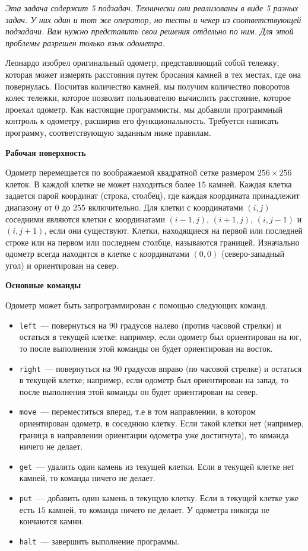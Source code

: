 \it{Эта задача содержит 5 подзадач. Технически они реализованы в виде 5 разных задач. У них один и тот же оператор, но тесты и чекер из соответствующей подзадачи. Вам нужно представить свои решения отдельно по ним. Для этой проблемы разрешен только язык одометра.}

Леонардо изобрел оригинальный одометр, представляющий собой тележку, которая может
измерять расстояния путем бросания камней в тех местах, где она повернулась. Посчитав
количество камней, мы получим количество поворотов колес тележки, которое позволит
пользователю вычислить расстояние, которое проехал одометр. Как настоящие
программисты, мы добавили программный контроль к одометру, расширив его
функциональность. Требуется написать программу, соответствующую заданным ниже
правилам.

\textbf{Рабочая поверхность}

Одометр перемещается по воображаемой квадратной сетке размером $256 \times 256$ клеток. В
каждой клетке не может находиться более $15$ камней. Каждая клетка задается парой
координат (строка, столбец), где каждая координата принадлежит диапазону от $0$ до $255$
включительно. Для клетки с координатами $(i, j)$ соседними являются клетки с
координатами $(i - 1, j)$, $(i + 1, j)$, $(i, j - 1)$ и $(i, j + 1)$, если они существуют. Клетки,
находящиеся на первой или последней строке или на первом или последнем столбце,
называются границей. Изначально одометр всегда находится в клетке с координатами $(0,
0)$ (северо-западный угол) и ориентирован на север.

\textbf{Основные команды}

Одометр может быть запрограммирован с помощью следующих команд.

\begin{itemize}
\item \texttt{left}~--- повернуться на $90$ градусов налево (против часовой стрелки) и остаться в
текущей клетке; например, если одометр был ориентирован на юг, то после
выполнения этой команды он будет ориентирован на восток.
\item \texttt{right}~--- повернуться на $90$ градусов вправо (по часовой стрелке) и остаться в
текущей клетке; например, если одометр был ориентирован на запад, то после
выполнения этой команды он будет ориентирован на север.
\item \texttt{move}~--- переместиться вперед, т.е в том направлении, в котором ориентирован
одометр, в соседнюю клетку. Если такой клетки нет (например, граница в
направлении ориентации одометра уже достигнута), то команда ничего не делает.
\item \texttt{get}~--- удалить один камень из текущей клетки. Если в текущей клетке нет камней,
то команда ничего не делает.
\item \texttt{put}~--- добавить один камень в текущую клетку. Если в текущей клетке уже есть $15$
камней, то команда ничего не делает. У одометра никогда не кончаются камни. 
\item \texttt{halt}~--- завершить выполнение программы.
\end{itemize}

